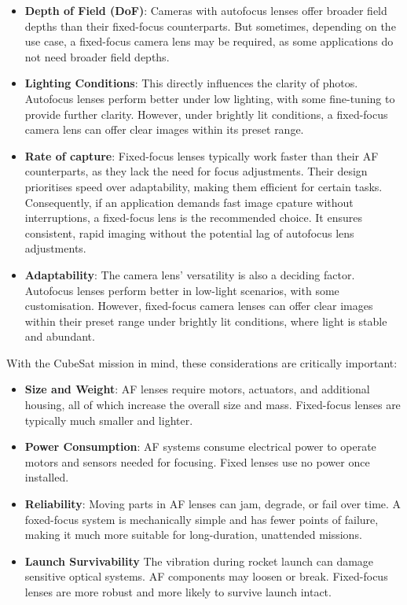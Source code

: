 \documentclass[10pt]{article}
\begin{document}
\begin{multicols}{2}
\begin{itemize}
    \item \textbf{Depth of Field (DoF)}: Cameras with autofocus lenses offer broader field depths than their fixed-focus counterparts. But sometimes, depending on the use case, a fixed-focus camera lens may be required, as some applications do not need broader field depths.
    \item \textbf{Lighting Conditions}: This directly influences the clarity of photos. Autofocus lenses perform better under low lighting, with some fine-tuning to provide further clarity. However, under brightly lit conditions, a fixed-focus camera lens can offer clear images within its preset range.
    \item \textbf{Rate of capture}: Fixed-focus lenses typically work faster than their AF counterparts, as they lack the need for focus adjustments. Their design prioritises speed over adaptability, making them efficient for certain tasks. Consequently, if an application demands fast image cpature without interruptions, a fixed-focus lens is the recommended choice. It ensures consistent, rapid imaging without the potential lag of autofocus lens adjustments.
    \item \textbf{Adaptability}: The camera lens' versatility is also a deciding factor. Autofocus lenses perform better in low-light scenarios, with some customisation. However, fixed-focus camera lenses can offer clear images within their preset range under brightly lit conditions, where light is stable and abundant.
\end{itemize}
With the CubeSat mission in mind, these considerations are critically important:
\begin{itemize}
    \item \textbf{Size and Weight}: AF lenses require motors, actuators, and additional housing, all of which increase the overall size and mass. Fixed-focus lenses are typically much smaller and lighter.
    \item \textbf{Power Consumption}: AF systems consume electrical power to operate motors and sensors needed for focusing. Fixed lenses use no power once installed.
    \item \textbf{Reliability}: Moving parts in AF lenses can jam, degrade, or fail over time. A foxed-focus system is mechanically simple and has fewer points of failure, making it much more suitable for long-duration, unattended missions.
    \item \textbf{Launch Survivability} The vibration during rocket launch can damage sensitive optical systems. AF components may loosen or break. Fixed-focus lenses are more robust and more likely to survive launch intact.

\end{itemize}
\end{multicols}
\end{document}
